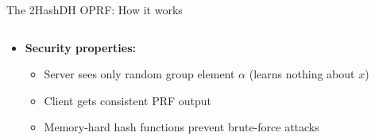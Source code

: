 \documentclass[aspectratio=169, lualatex, handout]{beamer}
\begin{document}
\begin{frame}{The 2HashDH OPRF: How it works}
	\begin{columns}[c]
		\begin{column}{1\textwidth}
			\begin{itemize}
				\item \textbf{Security properties:}
				      \begin{itemize}
					      \item Server sees only random group element $\alpha$ (learns nothing about $x$)
					      \item Client gets consistent PRF output
					      \item Memory-hard hash functions prevent brute-force attacks
				      \end{itemize}
			\end{itemize}
		\end{column}
	\end{columns}
\end{frame}
\end{document}
